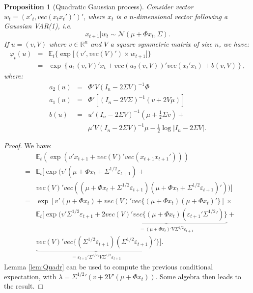 \documentclass[
  12pt,
]{book}
\newtheorem{proposition}{Proposition}[chapter]
\theoremstyle{definition}
\theoremstyle{definition}
\theoremstyle{definition}
\theoremstyle{definition}
\theoremstyle{remark}
\begin{document}
\begin{proposition}[Quadratic Gaussian process]
\protect\hypertarget{prp:QGVAR1}{}\label{prp:QGVAR1}Consider vector \(w_t = (x'_t,vec(x_t x_t')')'\), where \(x_t\) is a \(n\)-dimensional vector following a Gaussian VAR(1), i.e.
\[
x_{t+1}|\underline{w_t} \sim \mathcal{N}(\mu+\Phi x_t, \Sigma).
\]
If \(u = (v,V)\) where \(v \in \mathbb{R}^n\) and \(V\) a square symmetric matrix of size \(n\), we have:
\begin{eqnarray*}
\varphi_t(u) &=& \mathbb{E}_t\big\{\exp\big[(v',vec(V)')\times w_{t+1}\big]\big\} \\
& =& \exp \left\{a_1(v,V)'x_t +vec(a_2(v,V))' vec(x_t'x_t) + b(v,V) \right\},
\end{eqnarray*}
where:
\begin{eqnarray*}
a_2(u) & = & \Phi'V (I_n - 2\Sigma V)^{-1} \Phi \nonumber \\
a_1(u) & = & \Phi'\left[(I_n-2V\Sigma)^{-1}(v+2V\mu)\right] \nonumber \\
b(u) & = & u'(I_n - 2 \Sigma V)^{-1}\left(\mu + \frac{1}{2} \Sigma v\right) +\\
&& \mu'V(I_n - 2 \Sigma V)^{-1}\mu - \frac{1}{2}\log\big|I_n - 2\Sigma V\big|.\label{eq:laplaceZ}
\end{eqnarray*}
\end{proposition}

\begin{proof}
We have:
\begin{eqnarray*}
&&\mathbb{E}_t(\exp(v' x_{t+1} + vec(V)'vec(x_{t+1} x_{t+1}'))) \\
&=& \mathbb{E}_t[\exp(v' (\mu + \Phi x_t + \Sigma^{1/2}\varepsilon_{t+1}) + \\
&& vec(V)'vec((\mu + \Phi x_t + \Sigma^{1/2}\varepsilon_{t+1}) (\mu + \Phi x_t + \Sigma^{1/2}\varepsilon_{t+1})'))] \\
&=& \exp[v' (\mu + \Phi x_t) + vec(V)'vec\{(\mu + \Phi x_t)(\mu + \Phi x_t)'\}] \times \\
&& \mathbb{E}_t[\exp(v'\Sigma^{1/2}\varepsilon_{t+1} +2\underbrace{ vec(V)' vec\{(\mu + \Phi x_t)(\varepsilon_{t+1}'{\Sigma^{1/2}}')\}}_{=(\mu + \Phi x_t)'V\Sigma^{1/2}\varepsilon_{t+1}} +\\
&& \underbrace{vec(V)'vec\{(\Sigma^{1/2}\varepsilon_{t+1})(\Sigma^{1/2}\varepsilon_{t+1})'}_{=\varepsilon_{t+1}'{\Sigma^{1/2}}'V\Sigma^{1/2}\varepsilon_{t+1}}\}].
\end{eqnarray*}
Lemma \ref{lem:Quadr} can be used to compute the previous conditional expectation, with \(\lambda = {\Sigma^{1/2}}'(v + 2 V'(\mu + \Phi x_t))\). Some algebra then leads to the result.
\end{proof}
\end{document}
